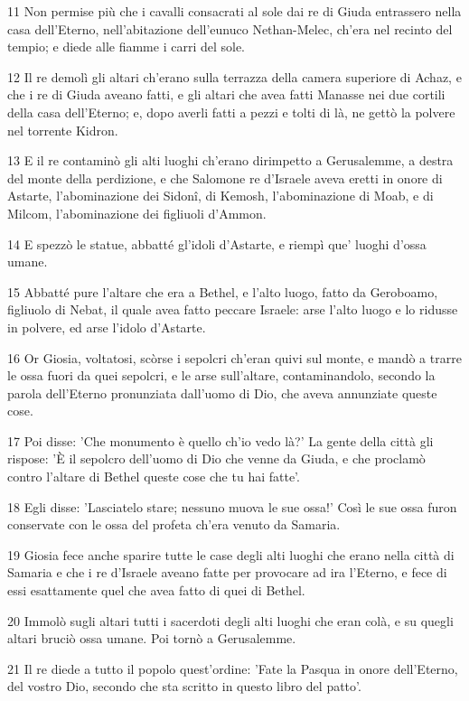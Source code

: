 \par 11 Non permise più che i cavalli consacrati al sole dai re di Giuda entrassero nella casa dell'Eterno, nell'abitazione dell'eunuco Nethan-Melec, ch'era nel recinto del tempio; e diede alle fiamme i carri del sole.
\par 12 Il re demolì gli altari ch'erano sulla terrazza della camera superiore di Achaz, e che i re di Giuda aveano fatti, e gli altari che avea fatti Manasse nei due cortili della casa dell'Eterno; e, dopo averli fatti a pezzi e tolti di là, ne gettò la polvere nel torrente Kidron.
\par 13 E il re contaminò gli alti luoghi ch'erano dirimpetto a Gerusalemme, a destra del monte della perdizione, e che Salomone re d'Israele aveva eretti in onore di Astarte, l'abominazione dei Sidonî, di Kemosh, l'abominazione di Moab, e di Milcom, l'abominazione dei figliuoli d'Ammon.
\par 14 E spezzò le statue, abbatté gl'idoli d'Astarte, e riempì que' luoghi d'ossa umane.
\par 15 Abbatté pure l'altare che era a Bethel, e l'alto luogo, fatto da Geroboamo, figliuolo di Nebat, il quale avea fatto peccare Israele: arse l'alto luogo e lo ridusse in polvere, ed arse l'idolo d'Astarte.
\par 16 Or Giosia, voltatosi, scòrse i sepolcri ch'eran quivi sul monte, e mandò a trarre le ossa fuori da quei sepolcri, e le arse sull'altare, contaminandolo, secondo la parola dell'Eterno pronunziata dall'uomo di Dio, che aveva annunziate queste cose.
\par 17 Poi disse: 'Che monumento è quello ch'io vedo là?' La gente della città gli rispose: 'È il sepolcro dell'uomo di Dio che venne da Giuda, e che proclamò contro l'altare di Bethel queste cose che tu hai fatte'.
\par 18 Egli disse: 'Lasciatelo stare; nessuno muova le sue ossa!' Così le sue ossa furon conservate con le ossa del profeta ch'era venuto da Samaria.
\par 19 Giosia fece anche sparire tutte le case degli alti luoghi che erano nella città di Samaria e che i re d'Israele aveano fatte per provocare ad ira l'Eterno, e fece di essi esattamente quel che avea fatto di quei di Bethel.
\par 20 Immolò sugli altari tutti i sacerdoti degli alti luoghi che eran colà, e su quegli altari bruciò ossa umane. Poi tornò a Gerusalemme.
\par 21 Il re diede a tutto il popolo quest'ordine: 'Fate la Pasqua in onore dell'Eterno, del vostro Dio, secondo che sta scritto in questo libro del patto'.
